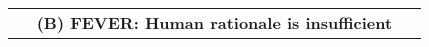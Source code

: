 \begin{table*}[t]
\begin{tabular}{@{}p{0.3\linewidth} p{0.3\linewidth} p{0.3\linewidth} @{}}
                                                                                                                                                                                                                                                                                                                                                                                                                                                                                                                                                                                                                                                                                                                                                                                          \\ \midrule
\multicolumn{3}{c}{\textbf{(B) FEVER: Human rationale is insufficient}}                                                                                                                                                                                                                                                                                                                                                                                                                                                                                                                                                                                                                                                                                                                                                                                                                                                                                                                                                                                                                                                                                                                                                                                                                                                                                                                                                                                                                                                                                                                                                                                                                                                                                                                                                                                                                                                                                                                                                                                                                                                                                                                                                                                                                                                                                                                                                                                                                              
\end{tabular}
\end{table*}
